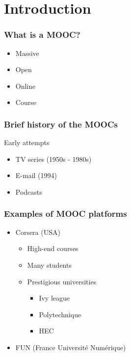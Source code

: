 \section{Introduction}
\setcounter{subsection}{1}
\begin{frame}
\frametitle{What is a MOOC?}
  \begin{itemize}[<+->]
    \item Massive
    \item Open
    \item Online
    \item Course
  \end{itemize}
\end{frame}

\begin{frame}
\frametitle{Brief history of the MOOCs}
  Early attempts
  \begin{itemize}[<+->]
    \item TV series (1950s - 1980s)
    \item E-mail (1994)
    \item Podcasts
  \end{itemize}
\end{frame}

\begin{frame}
\frametitle{Examples of MOOC platforms}
  \begin{itemize}[<+->]
    \item Corsera (USA)
      \begin{itemize}[<+->]
        \item High-end courses
        \item Many students
        \item Prestigious universities
          \begin{itemize}[<+->]
            \item Ivy league
            \item Polytechnique
            \item HEC
          \end{itemize}
      \end{itemize}
    \item FUN (France Université Numérique)
  \end{itemize}
\end{frame}

